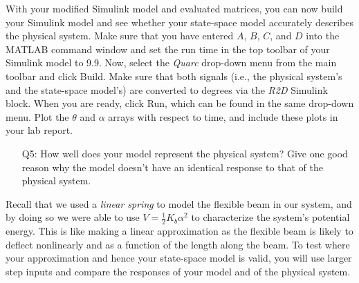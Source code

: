 \documentclass[12pt]{report}
\newcommand\drew[1]{\textcolor{red}{#1}}
\begin{document}
With your modified Simulink model and evaluated matrices, you can now build your Simulink model and see whether your state-space model accurately describes the physical system. Make sure that you have entered $A$, $B$, $C$, and $D$ into the MATLAB command window and set the run time in the top toolbar of your Simulink model to 9.9. Now, select the \emph{Quarc} drop-down menu from the main toolbar and click Build. Make sure that both signals (i.e., the physical system's and the state-space model's) are converted to degrees via the \emph{R2D} Simulink block. When you are ready, click Run, which can be found in the same drop-down menu. Plot the $\theta$ and $\alpha$ arrays with respect to time, and include these plots in your lab report.
\begin{enumerate}[Question]
    \item[Q5:] How well does your model represent the physical system? Give one good reason why the model doesn't have an identical response to that of the physical system.\\
\end{enumerate}
Recall that we used a \emph{linear spring} to model the flexible beam in our system, and by doing so we were able to use $V=\frac{1}{2}K_b \alpha^2$ to characterize the system's potential energy. This is like making a linear approximation as the flexible beam is likely to deflect nonlinearly and as a function of the length along the beam. To test where your approximation and hence your state-space model is valid, you will use larger step inputs and compare the responses of your model and of the physical system.
\end{document}
